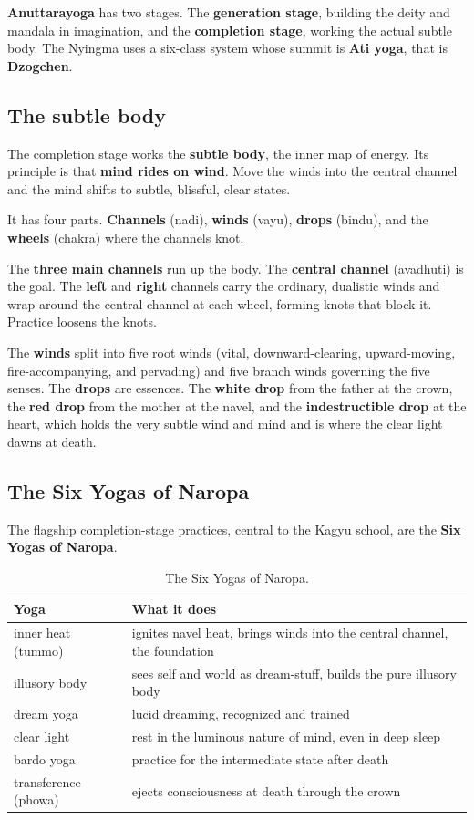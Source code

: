 \textbf{Anuttarayoga} has two stages. The \textbf{generation stage}, building the deity and mandala in imagination, and the \textbf{completion stage}, working the actual subtle body. The Nyingma uses a six-class system whose summit is \textbf{Ati yoga}, that is \textbf{Dzogchen}.

\subsection{The subtle body}

The completion stage works the \textbf{subtle body}, the inner map of energy. Its principle is that \textbf{mind rides on wind}. Move the winds into the central channel and the mind shifts to subtle, blissful, clear states.

It has four parts. \textbf{Channels} (nadi), \textbf{winds} (vayu), \textbf{drops} (bindu), and the \textbf{wheels} (chakra) where the channels knot.

The \textbf{three main channels} run up the body. The \textbf{central channel} (avadhuti) is the goal. The \textbf{left} and \textbf{right} channels carry the ordinary, dualistic winds and wrap around the central channel at each wheel, forming knots that block it. Practice loosens the knots.

The \textbf{winds} split into five root winds (vital, downward-clearing, upward-moving, fire-accompanying, and pervading) and five branch winds governing the five senses. The \textbf{drops} are essences. The \textbf{white drop} from the father at the crown, the \textbf{red drop} from the mother at the navel, and the \textbf{indestructible drop} at the heart, which holds the very subtle wind and mind and is where the clear light dawns at death.

\subsection{The Six Yogas of Naropa}

The flagship completion-stage practices, central to the Kagyu school, are the \textbf{Six Yogas of Naropa}.

\begin{longtable}{l L{8.0cm} }
\caption{The Six Yogas of Naropa.}\\
\toprule
\textbf{Yoga} & \textbf{What it does} \\
\midrule
inner heat (tummo) & ignites navel heat, brings winds into the central channel, the foundation \\
illusory body & sees self and world as dream-stuff, builds the pure illusory body \\
dream yoga & lucid dreaming, recognized and trained \\
clear light & rest in the luminous nature of mind, even in deep sleep \\
bardo yoga & practice for the intermediate state after death \\
transference (phowa) & ejects consciousness at death through the crown \\
\bottomrule
\end{longtable}

